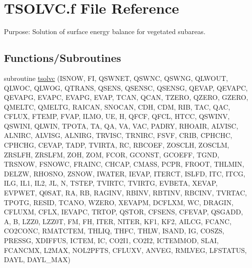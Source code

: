 \hypertarget{TSOLVC_8f}{}\section{T\+S\+O\+L\+V\+C.\+f File Reference}
\label{TSOLVC_8f}


Purpose\+: Solution of surface energy balance for vegetated subareas.  


\subsection*{Functions/\+Subroutines}
\begin{DoxyCompactItemize}
\item 
subroutine \hyperlink{TSOLVC_8f_a01fda37677d459d89fc416b29cb0aff3}{tsolvc} (I\+S\+N\+O\+W, F\+I, Q\+S\+W\+N\+E\+T, Q\+S\+W\+N\+C, Q\+S\+W\+N\+G, Q\+L\+W\+O\+U\+T, Q\+L\+W\+O\+C, Q\+L\+W\+O\+G, Q\+T\+R\+A\+N\+S, Q\+S\+E\+N\+S, Q\+S\+E\+N\+S\+C, Q\+S\+E\+N\+S\+G, Q\+E\+V\+A\+P, Q\+E\+V\+A\+P\+C, Q\+E\+V\+A\+P\+G, E\+V\+A\+P\+C, E\+V\+A\+P\+G, E\+V\+A\+P, T\+C\+A\+N, Q\+C\+A\+N, T\+Z\+E\+R\+O, Q\+Z\+E\+R\+O, G\+Z\+E\+R\+O, Q\+M\+E\+L\+T\+C, Q\+M\+E\+L\+T\+G, R\+A\+I\+C\+A\+N, S\+N\+O\+C\+A\+N, C\+D\+H, C\+D\+M, R\+I\+B, T\+A\+C, Q\+A\+C, C\+F\+L\+U\+X, F\+T\+E\+M\+P, F\+V\+A\+P, I\+L\+M\+O, U\+E, H, Q\+F\+C\+F, Q\+F\+C\+L, H\+T\+C\+C, Q\+S\+W\+I\+N\+V, Q\+S\+W\+I\+N\+I, Q\+L\+W\+I\+N, T\+P\+O\+T\+A, T\+A, Q\+A, V\+A, V\+A\+C, P\+A\+D\+R\+Y, R\+H\+O\+A\+I\+R, A\+L\+V\+I\+S\+C, A\+L\+N\+I\+R\+C, A\+L\+V\+I\+S\+G, A\+L\+N\+I\+R\+G, T\+R\+V\+I\+S\+C, T\+R\+N\+I\+R\+C, F\+S\+V\+F, C\+R\+I\+B, C\+P\+H\+C\+H\+C, C\+P\+H\+C\+H\+G, C\+E\+V\+A\+P, T\+A\+D\+P, T\+V\+I\+R\+T\+A, R\+C, R\+B\+C\+O\+E\+F, Z\+O\+S\+C\+L\+H, Z\+O\+S\+C\+L\+M, Z\+R\+S\+L\+F\+H, Z\+R\+S\+L\+F\+M, Z\+O\+H, Z\+O\+M, F\+C\+O\+R, G\+C\+O\+N\+S\+T, G\+C\+O\+E\+F\+F, T\+G\+N\+D, T\+R\+S\+N\+O\+W, F\+S\+N\+O\+W\+C, F\+R\+A\+I\+N\+C, C\+H\+C\+A\+P, C\+M\+A\+S\+S, P\+C\+P\+R, F\+R\+O\+O\+T, T\+H\+L\+M\+I\+N, D\+E\+L\+Z\+W, R\+H\+O\+S\+N\+O, Z\+S\+N\+O\+W, I\+W\+A\+T\+E\+R, I\+E\+V\+A\+P, I\+T\+E\+R\+C\+T, I\+S\+L\+F\+D, I\+T\+C, I\+T\+C\+G, I\+L\+G, I\+L1, I\+L2, J\+L, N, T\+S\+T\+E\+P, T\+V\+I\+R\+T\+C, T\+V\+I\+R\+T\+G, E\+V\+B\+E\+T\+A, X\+E\+V\+A\+P, E\+V\+P\+W\+E\+T, Q0\+S\+A\+T, R\+A, R\+B, R\+A\+G\+I\+N\+V, R\+B\+I\+N\+V, R\+B\+T\+I\+N\+V, R\+B\+C\+I\+N\+V, T\+V\+R\+T\+A\+C, T\+P\+O\+T\+G, R\+E\+S\+I\+D, T\+C\+A\+N\+O, W\+Z\+E\+R\+O, X\+E\+V\+A\+P\+M, D\+C\+F\+L\+X\+M, W\+C, D\+R\+A\+G\+I\+N, C\+F\+L\+U\+X\+M, C\+F\+L\+X, I\+E\+V\+A\+P\+C, T\+R\+T\+O\+P, Q\+S\+T\+O\+R, C\+F\+S\+E\+N\+S, C\+F\+E\+V\+A\+P, Q\+S\+G\+A\+D\+D, A, B, L\+Z\+Z0, L\+Z\+Z0\+T, F\+M, F\+H, I\+T\+E\+R, N\+I\+T\+E\+R, K\+F1, K\+F2, A\+I\+L\+C\+G, F\+C\+A\+N\+C, C\+O2\+C\+O\+N\+C, R\+M\+A\+T\+C\+T\+E\+M, T\+H\+L\+I\+Q, T\+H\+F\+C, T\+H\+L\+W, I\+S\+A\+N\+D, I\+G, C\+O\+S\+Z\+S, P\+R\+E\+S\+S\+G, X\+D\+I\+F\+F\+U\+S, I\+C\+T\+E\+M, I\+C, C\+O2\+I1, C\+O2\+I2, I\+C\+T\+E\+M\+M\+O\+D, S\+L\+A\+I, F\+C\+A\+N\+C\+M\+X, L2\+M\+A\+X, N\+O\+L2\+P\+F\+T\+S, C\+F\+L\+U\+X\+V, A\+N\+V\+E\+G, R\+M\+L\+V\+E\+G, L\+F\+S\+T\+A\+T\+U\+S, D\+A\+Y\+L, D\+A\+Y\+L\+\_\+\+M\+A\+X)
\end{DoxyCompactItemize}


